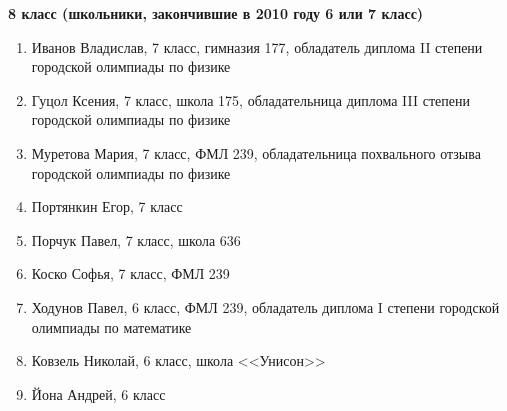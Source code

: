 \textbf{8 класс (школьники, закончившие в 2010 году 6 или 7 класс)}
\begin{enumerate}

\item Иванов Владислав, 7 класс, гимназия 177, обладатель диплома II степени городской олимпиады по физике
\item Гуцол Ксения, 7 класс, школа 175, обладательница диплома III степени городской олимпиады по физике
\item Муретова Мария, 7 класс, ФМЛ 239, обладательница похвального отзыва городской олимпиады по физике
\item Портянкин	Егор, 7 класс
\item Порчук Павел, 7 класс, школа 636
\item Коско	Софья, 7 класс, ФМЛ 239
\item Ходунов Павел, 6 класс, ФМЛ 239, обладатель диплома I степени городской олимпиады по математике
\item Ковзель Николай, 6 класс,	школа <<Унисон>>
\item Йона Андрей, 6 класс
\end{enumerate}
